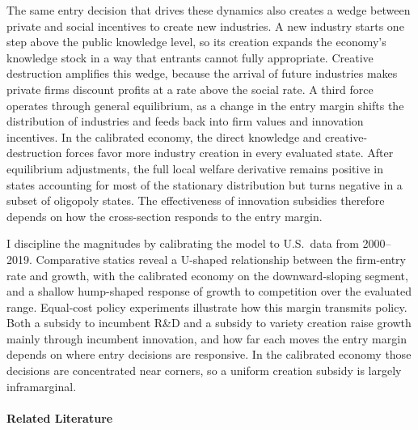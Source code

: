\documentclass[12pt]{article}
\begin{document}
The same entry decision that drives these dynamics also creates a wedge between private and social incentives to create new industries. A new industry starts one step above the public knowledge level, so its creation expands the economy's knowledge stock in a way that entrants cannot fully appropriate. Creative destruction amplifies this wedge, because the arrival of future industries makes private firms discount profits at a rate above the social rate. A third force operates through general equilibrium, as a change in the entry margin shifts the distribution of industries and feeds back into firm values and innovation incentives. In the calibrated economy, the direct knowledge and creative-destruction forces favor more industry creation in every evaluated state. After equilibrium adjustments, the full local welfare derivative remains positive in states accounting for most of the stationary distribution but turns negative in a subset of oligopoly states. The effectiveness of innovation subsidies therefore depends on how the cross-section responds to the entry margin.

I discipline the magnitudes by calibrating the model to U.S.\ data from 2000--2019. Comparative statics reveal a U-shaped relationship between the firm-entry rate and growth, with the calibrated economy on the downward-sloping segment, and a shallow hump-shaped response of growth to competition over the evaluated range. Equal-cost policy experiments illustrate how this margin transmits policy. Both a subsidy to incumbent R\&D and a subsidy to variety creation raise growth mainly through incumbent innovation, and how far each moves the entry margin depends on where entry decisions are responsive. In the calibrated economy those decisions are concentrated near corners, so a uniform creation subsidy is largely inframarginal.

\paragraph{Related Literature}
\end{document}
